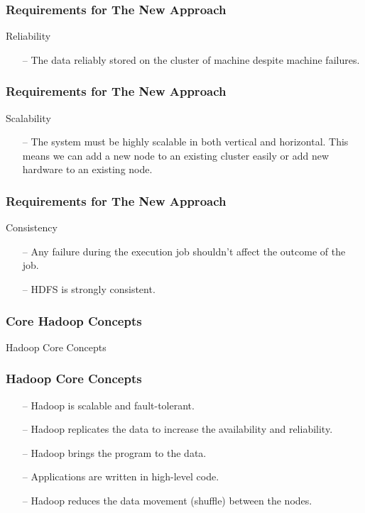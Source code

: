 \begin{frame}[c]{ }
	\frametitle{Requirements for The New Approach }
	Reliability
	\begin{itemize}  [<+->]
		\item [--] {\footnotesize The data reliably stored on the cluster of machine despite machine failures. }		
	\end{itemize}
\end{frame}
\begin{frame}[c]{ }
	\frametitle{Requirements for The New Approach }
	Scalability
	\begin{itemize}  [<+->]
		\item [--] {\footnotesize The system must be highly scalable in both vertical and horizontal. This means we can add a new node to an existing cluster easily or add new hardware to an existing node.}		
	\end{itemize}
\end{frame}
\begin{frame}[c]{ }
	\frametitle{Requirements for The New Approach }
	Consistency
	\begin{itemize}  [<+->]
		\item [--] {\footnotesize Any failure during the execution job shouldn't affect the outcome of the job.}		
		\item [--] {\footnotesize HDFS is strongly consistent.}		
	\end{itemize}
\end{frame}
\begin{frame}[c]{ }
	\frametitle{Core Hadoop Concepts }
	\centering     
	
	\textcolor{offgreen}{ \large Hadoop Core Concepts}
\end{frame}
\begin{frame}[c]{ }
	\frametitle{Hadoop Core Concepts }
	
	
	\begin{itemize}  [<+->]
		\item [--] Hadoop is scalable and fault-tolerant.
		\item [--] Hadoop replicates the data to increase the availability and reliability.
		\item [--] Hadoop brings the program to the data.
		\item [--] Applications are written in high-level code.
		\item [--] Hadoop reduces the data movement (shuffle) between the nodes.
		
	\end{itemize}
\end{frame}
